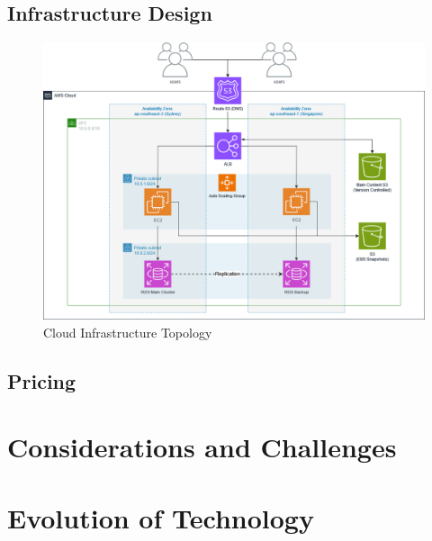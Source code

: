 \documentclass[]{article}
\begin{document}
\subsection{Infrastructure Design}
\begin{figure}[H]\label{fig:awsdiagram}
    \centering
    \includegraphics[width=\textwidth]{cci_aws}
    \caption{Cloud Infrastructure Topology}
\end{figure}

\subsection{Pricing}


\section{Considerations and Challenges}

\section{Evolution of Technology}
\end{document}
